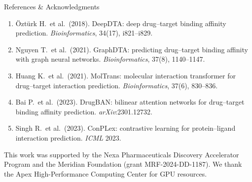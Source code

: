 \documentclass[20pt,landscape]{extarticle}
\begin{document}
\begin{minipage}[t]{0.325\textwidth}
\vspace{6pt}
\begin{posterblockteal}{References \& Acknowledgments}
\fontsize{11}{14}\selectfont
\begin{enumerate}[leftmargin=*,nosep]
  \item \"{O}zt\"{u}rk H.\ et al.\ (2018). DeepDTA: deep drug--target binding affinity prediction. \textit{Bioinformatics}, 34(17), i821--i829.
  \item Nguyen T.\ et al.\ (2021). GraphDTA: predicting drug--target binding affinity with graph neural networks. \textit{Bioinformatics}, 37(8), 1140--1147.
  \item Huang K.\ et al.\ (2021). MolTrans: molecular interaction transformer for drug--target interaction prediction. \textit{Bioinformatics}, 37(6), 830--836.
  \item Bai P.\ et al.\ (2023). DrugBAN: bilinear attention networks for drug--target binding affinity prediction. \textit{arXiv}:2301.12732.
  \item Singh R.\ et al.\ (2023). ConPLex: contrastive learning for protein--ligand interaction prediction. \textit{ICML} 2023.
\end{enumerate}
\vspace{4pt}
This work was supported by the Nexa Pharmaceuticals Discovery Accelerator Program and the Meridian Foundation
(grant MRF-2024-DD-1187). We thank the Apex High-Performance Computing Center for GPU resources.
\end{posterblockteal}

\end{minipage}

\vspace{0.3in}
\end{document}
